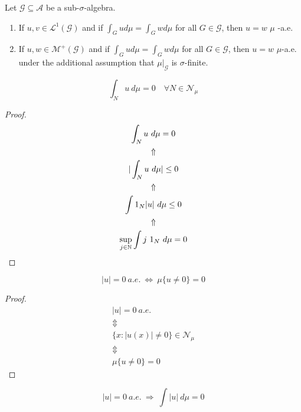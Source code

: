 \begin{thm}
Let \(\mathcal{G}\subseteq \mathcal{A}\) be a sub-\(\sigma \)-algebra.

\begin{enumerate}
  \item If \(u,v\in \mathcal{L}^1(\mathcal{G})\) and if \(\int _G u d\mu  = \int _Gwd\mu \) for all \(G\in \mathcal{G}\), then \(u=w\) \(\mu \)
-a.e.
  \item If \(u,w\in \mathcal{M}^+(\mathcal{G})\) and if \(\int _G u d\mu  =\int _G w d\mu \) for all \(G\in \mathcal{G}\), then \(u=w\) \(\mu \)-a.e. under the additional assumption that \(\mu |_\mathcal{G}\) is \(\sigma \)-finite.
\end{enumerate}
\end{thm}


\begin{prop}
\[
\int _N u\  d\mu =0 \quad  \forall N\in \mathcal{N}_\mu 
\]
\end{prop}

\begin{proof}
\begin{gather*}
\int _N u\  d\mu =0 \\
\Uparrow  \\
|\int _N u\  d\mu |\leq 0 \\
\Uparrow  \\
\int  1_N |u|\  d\mu \leq 0 \\
\Uparrow  \\
\sup_{j\in \Bbb{N}}\int  j\  1_N\  d\mu =0
\end{gather*}
\end{proof}

\begin{prop}
\[
|u|=0\  a.e.\  \Longleftrightarrow \  \mu \{u\neq 0\}=0
\]
\end{prop}

\begin{proof}
\begin{gather*}
|u|=0\  a.e. \\
\Updownarrow  \\
\{x : |u(x)|\neq 0 \} \in  \mathcal{N}_\mu  \\
\Updownarrow  \\
\mu \{u\neq 0\}=0
\end{gather*}
\end{proof}

\begin{prop}
\[
|u|=0 \  a.e.\  \Longrightarrow \  \int |u|\  d\mu =0
\]
\end{prop}

